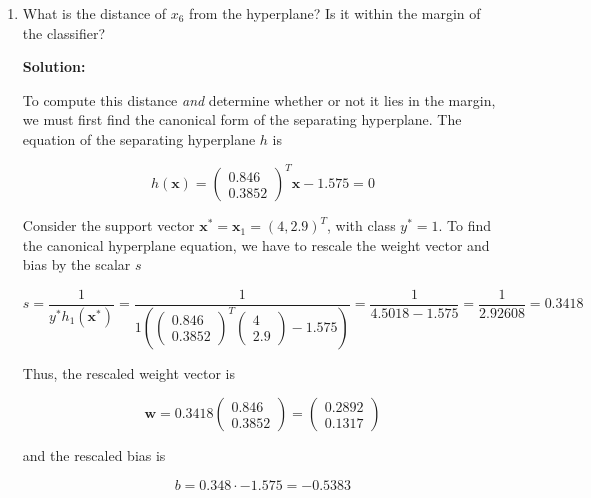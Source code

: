 \documentclass[11pt]{article}
\begin{document}
\begin{enumerate}
\begin{enumerate}
\item What is the distance of $x_6$ from the hyperplane? Is it within the margin of the classifier?

\textbf{Solution:}

To compute this distance \textit{and} determine whether or not it lies in the margin, we must first find the canonical form of the separating hyperplane. The equation of the separating hyperplane $h$ is

\begin{equation*}
h(\mathbf{x}) = \left( \begin{array}{c} 0.846 \\ 0.3852 \end{array} \right)^\mathit{T} \mathbf{x} - 1.575 = 0
\end{equation*}

Consider the support vector $\mathbf{x}^* = \mathbf{x}_1 = (4,2.9)^\mathit{T}$, with class $y^* = 1$. To find the canonical hyperplane equation, we have to rescale the weight vector and bias by the scalar $s$

\begin{equation*}
s = \frac{1}{y^*h_1(\mathbf{x}^*)} = \frac{1}{1\left(
\left(
\begin{array}{c}
0.846 \\ 0.3852
\end{array}
\right)^\mathit{T}
\left(
\begin{array}{c}
4 \\ 2.9
\end{array}
\right) - 1.575 \right)}
=
\frac{1}{4.5018 - 1.575}
=
\frac{1}{2.92608}
=
0.3418
\end{equation*}

Thus, the rescaled weight vector is

\begin{equation*}
\mathbf{w} = 0.3418
\left(
\begin{array}{c}
0.846 \\ 0.3852
\end{array}
\right)
=
\left(
\begin{array}{c}
0.2892 \\ 0.1317
\end{array}
\right)
\end{equation*}

and the rescaled bias is

\begin{equation*}
b = 0.348 \cdot -1.575 = -0.5383
\end{equation*}


\end{enumerate}
\end{enumerate}
\end{document}
